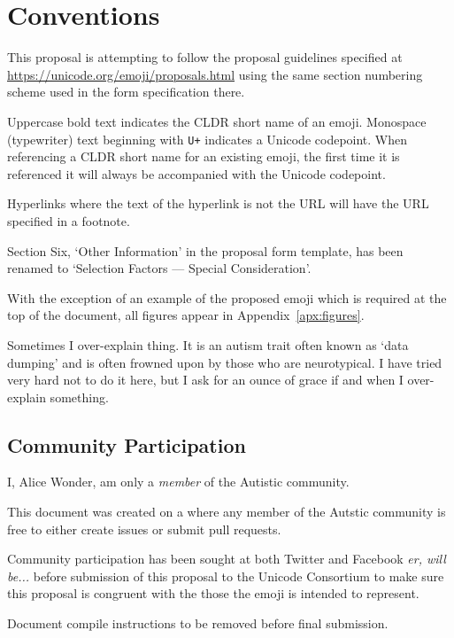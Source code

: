 \section*{Conventions} %

This proposal is attempting to follow the proposal guidelines specified at \url{https://unicode.org/emoji/proposals.html} using the same section numbering scheme used in the form specification there.

Uppercase bold text indicates the CLDR short name of an emoji. Monospace (typewriter) text beginning with \texttt{U+} indicates a Unicode codepoint. When referencing a CLDR short name for an existing emoji, the first time it is referenced it will always be accompanied with the Unicode codepoint.

Hyperlinks where the text of the hyperlink is not the URL will have the URL specified in a footnote.

Section Six, `Other Information' in the proposal form template, has been renamed to `Selection Factors --- Special Consideration'.

With the exception of an example of the proposed emoji which is required at the top of the document, all figures appear in Appendix~\ref{apx:figures}.

Sometimes I over-explain thing. It is an autism trait often known as `data dumping' and is often frowned upon by those who are neurotypical. I have tried very hard not to do it here, but I ask for an ounce of grace if and when I over-explain something.

\subsection*{Community Participation}

I, Alice Wonder, am only a \emph{member} of the Autistic community.

This document was created on a  where any member of the Autstic community is free to either create issues or submit pull requests.

Community participation has been sought at both Twitter and Facebook \emph{er, will be...} before submission of this proposal to the Unicode Consortium to make sure this proposal is congruent with the those the emoji is intended to represent.

Document compile instructions to be removed before final submission.

